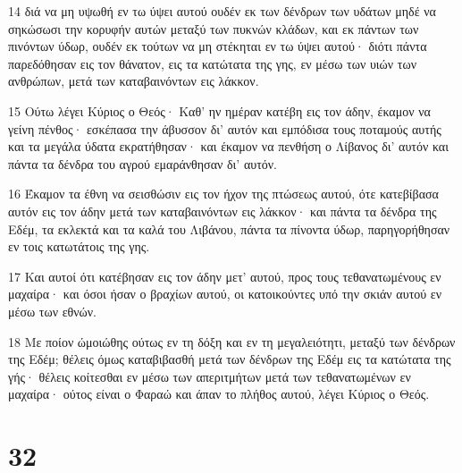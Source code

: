 \par 14 διά να μη υψωθή εν τω ύψει αυτού ουδέν εκ των δένδρων των υδάτων μηδέ να σηκώσωσι την κορυφήν αυτών μεταξύ των πυκνών κλάδων, και εκ πάντων των πινόντων ύδωρ, ουδέν εκ τούτων να μη στέκηται εν τω ύψει αυτού· διότι πάντα παρεδόθησαν εις τον θάνατον, εις τα κατώτατα της γης, εν μέσω των υιών των ανθρώπων, μετά των καταβαινόντων εις λάκκον.
\par 15 Ούτω λέγει Κύριος ο Θεός· Καθ' ην ημέραν κατέβη εις τον άδην, έκαμον να γείνη πένθος· εσκέπασα την άβυσσον δι' αυτόν και εμπόδισα τους ποταμούς αυτής και τα μεγάλα ύδατα εκρατήθησαν· και έκαμον να πενθήση ο Λίβανος δι' αυτόν και πάντα τα δένδρα του αγρού εμαράνθησαν δι' αυτόν.
\par 16 Έκαμον τα έθνη να σεισθώσιν εις τον ήχον της πτώσεως αυτού, ότε κατεβίβασα αυτόν εις τον άδην μετά των καταβαινόντων εις λάκκον· και πάντα τα δένδρα της Εδέμ, τα εκλεκτά και τα καλά του Λιβάνου, πάντα τα πίνοντα ύδωρ, παρηγορήθησαν εν τοις κατωτάτοις της γης.
\par 17 Και αυτοί ότι κατέβησαν εις τον άδην μετ' αυτού, προς τους τεθανατωμένους εν μαχαίρα· και όσοι ήσαν ο βραχίων αυτού, οι κατοικούντες υπό την σκιάν αυτού εν μέσω των εθνών.
\par 18 Με ποίον ώμοιώθης ούτως εν τη δόξη και εν τη μεγαλειότητι, μεταξύ των δένδρων της Εδέμ; θέλεις όμως καταβιβασθή μετά των δένδρων της Εδέμ εις τα κατώτατα της γής· θέλεις κοίτεσθαι εν μέσω των απεριτμήτων μετά των τεθανατωμένων εν μαχαίρα· ούτος είναι ο Φαραώ και άπαν το πλήθος αυτού, λέγει Κύριος ο Θεός.

\chapter{32}

